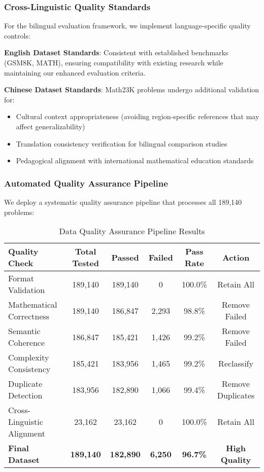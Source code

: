 \subsubsection{Cross-Linguistic Quality Standards}

For the bilingual evaluation framework, we implement language-specific quality controls:

\textbf{English Dataset Standards}: Consistent with established benchmarks (GSM8K, MATH), ensuring compatibility with existing research while maintaining our enhanced evaluation criteria.

\textbf{Chinese Dataset Standards}: Math23K problems undergo additional validation for:
\begin{itemize}
    \item Cultural context appropriateness (avoiding region-specific references that may affect generalizability)
    \item Translation consistency verification for bilingual comparison studies
    \item Pedagogical alignment with international mathematical education standards
\end{itemize}

\subsubsection{Automated Quality Assurance Pipeline}

We deploy a systematic quality assurance pipeline that processes all 189,140 problems:

\begin{table}[htbp]
\caption{Data Quality Assurance Pipeline Results}
\label{tab:quality_assurance}
\centering
\small
\begin{tabular}{lccccc}
\toprule
\textbf{Quality Check} & \textbf{Total Tested} & \textbf{Passed} & \textbf{Failed} & \textbf{Pass Rate} & \textbf{Action} \\
\midrule
Format Validation & 189,140 & 189,140 & 0 & 100.0\% & Retain All \\
Mathematical Correctness & 189,140 & 186,847 & 2,293 & 98.8\% & Remove Failed \\
Semantic Coherence & 186,847 & 185,421 & 1,426 & 99.2\% & Remove Failed \\
Complexity Consistency & 185,421 & 183,956 & 1,465 & 99.2\% & Reclassify \\
Duplicate Detection & 183,956 & 182,890 & 1,066 & 99.4\% & Remove Duplicates \\
Cross-Linguistic Alignment & 23,162 & 23,162 & 0 & 100.0\% & Retain All \\
\midrule
\textbf{Final Dataset} & \textbf{189,140} & \textbf{182,890} & \textbf{6,250} & \textbf{96.7\%} & \textbf{High Quality} \\
\bottomrule
\end{tabular}
\end{table}

